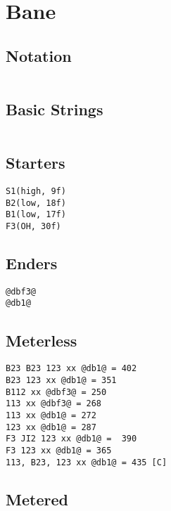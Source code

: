\documentclass[main.tex]{subfiles}
\begin{document}
\chapter{Bane}

\section{Notation}
\begin{lstlisting}[language=FG]

\end{lstlisting}


\section{Basic Strings}

\begin{lstlisting}[language=FG]
\end{lstlisting}

\section{Starters}
\begin{lstlisting}[language=FG]
S1(high, 9f)
B2(low, 18f)
B1(low, 17f) 
F3(OH, 30f)
\end{lstlisting}

\section{Enders}
\begin{lstlisting}[language=FG]
@dbf3@
@db1@
\end{lstlisting}

\section{Meterless}


\begin{lstlisting}[language=FG]
B23 B23 123 xx @db1@ = 402 
B23 123 xx @db1@ = 351
B112 xx @dbf3@ = 250
113 xx @dbf3@ = 268
113 xx @db1@ = 272
123 xx @db1@ = 287 
F3 JI2 123 xx @db1@ =  390 
F3 123 xx @db1@ = 365 
113, B23, 123 xx @db1@ = 435 [C]
\end{lstlisting}



\section{Metered}
\end{document}
